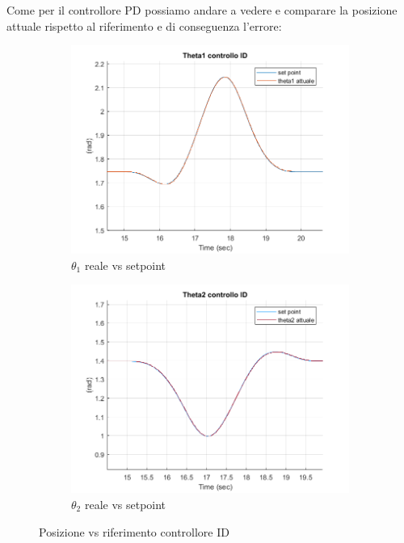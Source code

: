 Come per il controllore PD possiamo andare a vedere e comparare la posizione attuale rispetto al riferimento e di conseguenza l'errore:
\begin{figure}[!ht]
\begin{subfigure}{.53\textwidth}
  \centering
  \includegraphics[width=.8\linewidth]{Immagini/Traiettorie/Theta1ID}  
  \caption{$\theta_1$ reale vs setpoint}
  \label{fig:sub-id1}
\end{subfigure}
\begin{subfigure}{.53\textwidth}
  \centering
  \includegraphics[width=.8\linewidth]{Immagini/Traiettorie/Theta2ID}  
  \caption{$\theta_2$ reale vs setpoint}
  \label{fig:sub-pd2k}
\end{subfigure}
\caption{Posizione vs riferimento controllore ID}
\end{figure}
